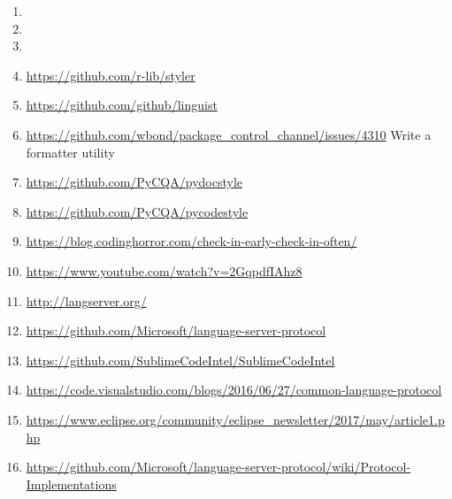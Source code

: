{\begin{enumerate}
    \item {}
    \item {}
    \item {}
    \item \url{https://github.com/r-lib/styler}
    \item \url{https://github.com/github/linguist}
    \item \url{https://github.com/wbond/package_control_channel/issues/4310} Write a formatter utility
    \item \url{https://github.com/PyCQA/pydocstyle}
    \item \url{https://github.com/PyCQA/pycodestyle}
    \item \url{https://blog.codinghorror.com/check-in-early-check-in-often/}
    \item \url{https://www.youtube.com/watch?v=2GqpdfIAhz8}
    \item \url{http://langserver.org/}
    \item \url{https://github.com/Microsoft/language-server-protocol}
    \item \url{https://github.com/SublimeCodeIntel/SublimeCodeIntel}
    \item \url{https://code.visualstudio.com/blogs/2016/06/27/common-language-protocol}
    \item \url{https://www.eclipse.org/community/eclipse_newsletter/2017/may/article1.php}
    \item \url{https://github.com/Microsoft/language-server-protocol/wiki/Protocol-Implementations}
\end{enumerate}
}
